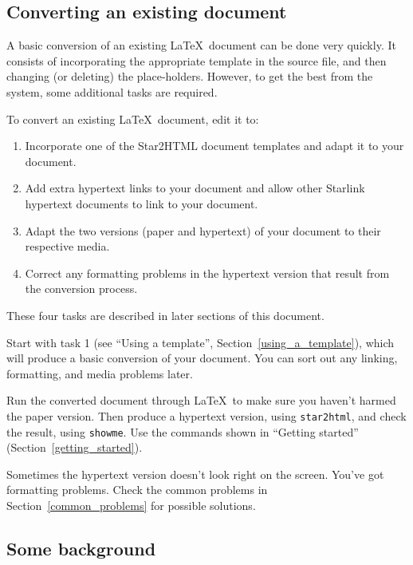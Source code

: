 \documentclass[twoside,11pt]{article}
\newcommand{\htmlref}[2]{#1}
\newcommand{\latex}[1]{#1}
\newcommand{\xlabel}[1]{}
\renewcommand{\_}{\texttt{\symbol{95}}}
\begin{document}
\subsection{\xlabel{converting_an_existing_document}Converting an existing document}

A basic conversion of an existing \LaTeX\ document can be done very quickly.
It consists of incorporating the appropriate template in the source file, and
then changing (or deleting) the place-holders. However, to get the best from
the system, some additional tasks are required.

To convert an existing \LaTeX\ document, edit it to:

\begin{enumerate}
\item Incorporate one of the Star2HTML document templates and adapt it to
 your document.
\item Add extra hypertext links to your document and allow other Starlink
hypertext documents to link to your document.
\item Adapt the two versions (paper and hypertext) of your document to their
 respective media.
\item Correct any formatting problems in the hypertext version that result from
 the conversion process.
\end{enumerate}

These four tasks are described in later sections of this document.

Start with task 1 (see
\htmlref{``Using a template''}{using_a_template}\latex{,
Section~\ref{using_a_template}}), which will produce a basic conversion of your
document.
You can sort out any linking, formatting, and media problems later.

Run the converted document through \LaTeX\ to make sure you haven't
harmed the paper version.
Then produce a hypertext version, using \texttt{star2html}, and check the
result, using \texttt{showme}.
Use the commands shown in
\htmlref{``Getting started''}{getting_started}\latex{ (Section~\ref{getting_started})}.

Sometimes the hypertext version doesn't look right on the screen.
You've got formatting problems.
Check the
\htmlref{common problems}{common_problems}
\latex{in Section~\ref{common_problems}} for possible solutions.

\subsection{\xlabel{some_background}Some background}
\end{document}
